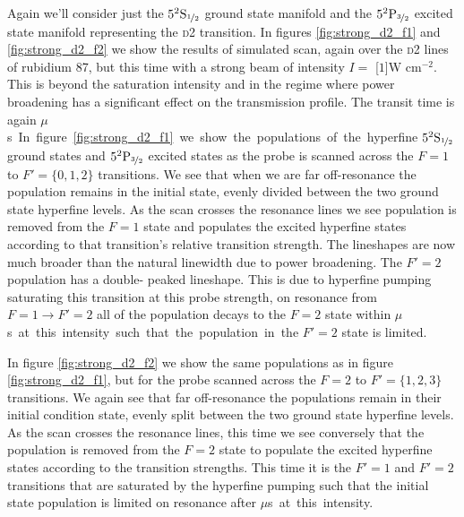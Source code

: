     Again we'll consider just the $5^2\rm{S}_{\nicefrac{1}{2}}$ ground state
    manifold and the $5^2\rm{P}_{\nicefrac{3}{2}}$ excited state manifold
    representing the \textsc{d2} transition. In figures \ref{fig:strong_d2_f1}
    and \ref{fig:strong_d2_f2} we show the results of simulated scan, again over
    the \textsc{d2} lines of rubidium 87, but this time with a strong beam of
    intensity $I = $ \unit[$1$]{W cm$^{-2}$}. This is beyond the saturation
    intensity and in the regime where power broadening has a significant effect
    on the transmission profile. The transit time is again \unit[2]{$\mu$s}.

    In figure \ref{fig:strong_d2_f1} we show the populations of the hyperfine
    $5^2\rm{S}_{\nicefrac{1}{2}}$ ground states and
    $5^2\rm{P}_{\nicefrac{3}{2}}$ excited states as the probe is scanned across
    the $F = 1$ to $F' = \{ 0, 1, 2 \}$ transitions. We see that when we are far
    off-resonance the population remains in the initial state, evenly divided
    between the two ground state hyperfine levels. As the scan crosses the
    resonance lines we see population is removed from the $F = 1$ state and
    populates the excited hyperfine states according to that transition's
    relative transition strength. The lineshapes are now much broader than the
    natural linewidth due to power broadening\cite{loudon2000quantum}. The $F' =
    2$ population has a double- peaked lineshape. This is due to hyperfine
    pumping saturating this transition at this probe strength, \ie on resonance
    from $F = 1 \rightarrow F' = 2$ all of the population decays to the $F = 2$
    state within \unit[2]{$\mu$s} at this intensity such that the population in
    the $F' = 2$ state is limited.

    In figure \ref{fig:strong_d2_f2} we show the same populations as in figure
    \ref{fig:strong_d2_f1}, but for the probe scanned across the $F = 2$ to $F'
    = \{ 1, 2, 3 \}$ transitions. We again see that far off-resonance the
    populations remain in their initial condition state, evenly split between
    the two ground state hyperfine levels. As the scan crosses the resonance
    lines, this time we see conversely that the population is removed from the
    $F = 2$ state to populate the excited hyperfine states according to the
    transition strengths. This time it is the $F' = 1$ and $F' = 2$ transitions
    that are saturated by the hyperfine pumping such that the initial state
    population is limited on resonance after \unit[2]{$\mu$s} at this intensity.

